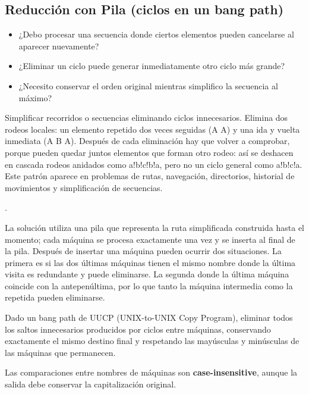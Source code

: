 \subsection{Reducción con Pila (ciclos en un bang path)}
\label{alg:3-12}


\begin{itemize}
\item ¿Debo procesar una secuencia donde ciertos elementos pueden cancelarse al aparecer nuevamente?
\item ¿Eliminar un ciclo puede generar inmediatamente otro ciclo más grande?
\item ¿Necesito conservar el orden original mientras simplifico la secuencia al máximo?
\end{itemize}

 Simplificar recorridos o secuencias eliminando ciclos innecesarios. Elimina dos rodeos locales: un elemento repetido dos veces seguidas (A A) y una ida y vuelta inmediata (A B A). Después de cada eliminación hay que volver a comprobar, porque pueden quedar juntos elementos que forman otro rodeo: así se deshacen en cascada rodeos anidados como a!b!c!b!a, pero no un ciclo general como a!b!c!a. Este patrón aparece en problemas de rutas, navegación, directorios, historial de movimientos y simplificación de secuencias.

 .

 La solución utiliza una pila que representa la ruta simplificada construida hasta el momento; cada máquina se procesa exactamente una vez y se inserta al final de la pila. Después de insertar una máquina pueden ocurrir dos situaciones. La primera es si las dos últimas máquinas tienen el mismo nombre donde la última visita es redundante y puede eliminarse. La segunda donde la última máquina coincide con la antepenúltima, por lo que tanto la máquina intermedia como la repetida pueden eliminarse.


Dado un bang path de UUCP (UNIX-to-UNIX Copy Program), eliminar todos los saltos innecesarios producidos por ciclos entre máquinas, conservando exactamente el mismo destino final y respetando las mayúsculas y minúsculas de las máquinas que permanecen.

Las comparaciones entre nombres de máquinas son \textbf{case-insensitive}, aunque la salida debe conservar la capitalización original.

